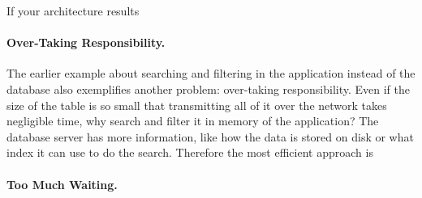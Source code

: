 If your architecture results 

\paragraph{Over-Taking Responsibility.}
The earlier example about searching and filtering in the application instead of the database also exemplifies another problem: over-taking responsibility. Even if the size of the table is so small that transmitting all of it over the network takes negligible time, why search and filter it in memory of the application? The database server has more information, like how the data is stored on disk or what index it can use to do the search. Therefore the most efficient approach is 


\paragraph{Too Much Waiting.} 






